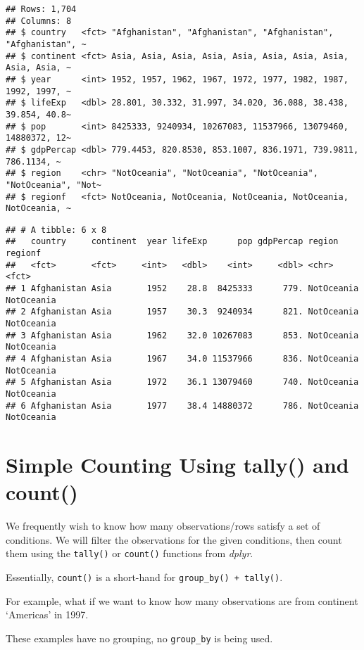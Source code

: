 \documentclass[
]{book}
\begin{document}
\begin{verbatim}
## Rows: 1,704
## Columns: 8
## $ country   <fct> "Afghanistan", "Afghanistan", "Afghanistan", "Afghanistan", ~
## $ continent <fct> Asia, Asia, Asia, Asia, Asia, Asia, Asia, Asia, Asia, Asia, ~
## $ year      <int> 1952, 1957, 1962, 1967, 1972, 1977, 1982, 1987, 1992, 1997, ~
## $ lifeExp   <dbl> 28.801, 30.332, 31.997, 34.020, 36.088, 38.438, 39.854, 40.8~
## $ pop       <int> 8425333, 9240934, 10267083, 11537966, 13079460, 14880372, 12~
## $ gdpPercap <dbl> 779.4453, 820.8530, 853.1007, 836.1971, 739.9811, 786.1134, ~
## $ region    <chr> "NotOceania", "NotOceania", "NotOceania", "NotOceania", "Not~
## $ regionf   <fct> NotOceania, NotOceania, NotOceania, NotOceania, NotOceania, ~
\end{verbatim}

\begin{verbatim}
## # A tibble: 6 x 8
##   country     continent  year lifeExp      pop gdpPercap region     regionf   
##   <fct>       <fct>     <int>   <dbl>    <int>     <dbl> <chr>      <fct>     
## 1 Afghanistan Asia       1952    28.8  8425333      779. NotOceania NotOceania
## 2 Afghanistan Asia       1957    30.3  9240934      821. NotOceania NotOceania
## 3 Afghanistan Asia       1962    32.0 10267083      853. NotOceania NotOceania
## 4 Afghanistan Asia       1967    34.0 11537966      836. NotOceania NotOceania
## 5 Afghanistan Asia       1972    36.1 13079460      740. NotOceania NotOceania
## 6 Afghanistan Asia       1977    38.4 14880372      786. NotOceania NotOceania
\end{verbatim}

\hypertarget{simple-counting-using-tally-and-count}{%
\section{Simple Counting Using tally() and count()}\label{simple-counting-using-tally-and-count}}

We frequently wish to know how many observations/rows satisfy a set of conditions. We will filter the observations for the given conditions, then count them using the \texttt{tally()} or \texttt{count()} functions from \emph{dplyr}.

Essentially, \texttt{count()} is a short-hand for \texttt{group\_by()\ +\ tally()}.

For example, what if we want to know how many observations are from continent `Americas' in 1997.

These examples have no grouping, no \texttt{group\_by} is being used.
\end{document}
